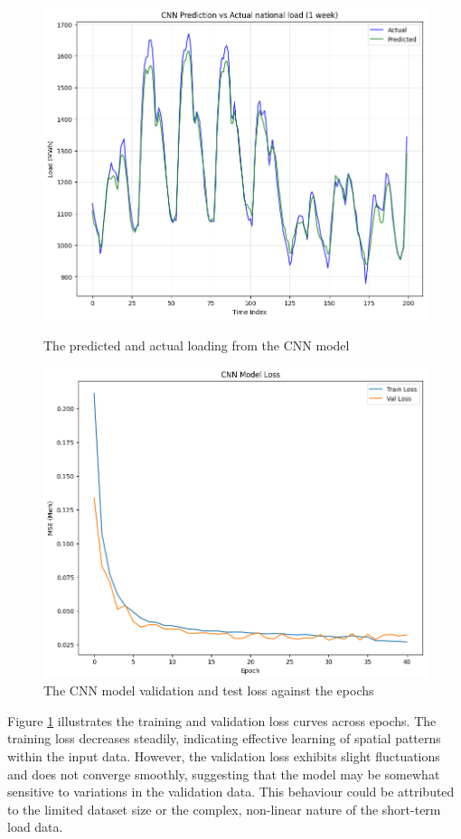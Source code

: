 \begin{figure}[h!]
	\centering
	\begin{minipage}[b]{0.46\linewidth}
	\includegraphics[width=\linewidth]{Chapters/images/results/cnn_predictionvsactual}
	\caption{The predicted and actual loading from the CNN model}
	\label{fig:cnnpredictionvsactual}
	\end{minipage}
	\begin{minipage}[b]{0.46\linewidth}
	\includegraphics[width=\linewidth]{Chapters/images/results/CNN_model_loss}
	\caption{The CNN model validation and test loss against the epochs}
	\label{fig:cnnmodelloss}
	\end{minipage}
\end{figure}
Figure \ref{fig:cnnmodelloss} illustrates the training and validation loss curves across epochs. The training loss decreases steadily, indicating effective learning of spatial patterns within the input data. However, the validation loss exhibits slight fluctuations and does not converge smoothly, suggesting that the model may be somewhat sensitive to variations in the validation data. This behaviour could be attributed to the limited dataset size or the complex, non-linear nature of the short-term load data.

